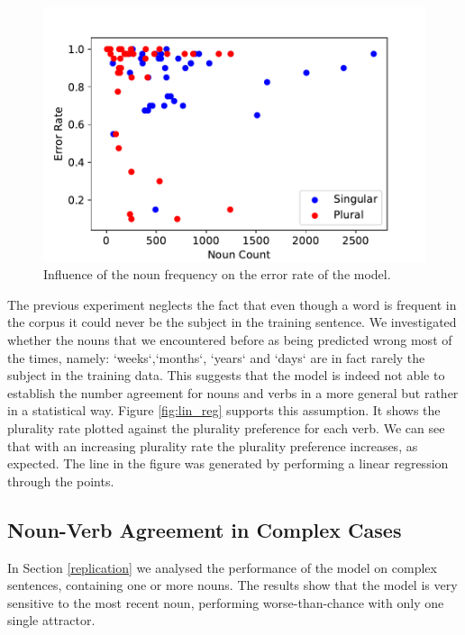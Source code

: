          \begin{figure}
          \centering
        \includegraphics[scale=0.5]{noun_freq_error_rate.pdf}
        \caption{Influence of the noun frequency on the error rate of the model.}
        \label{fig:noun_freq_error}
    \end{figure}
    
    
The previous experiment neglects the fact that even though a word is frequent in the corpus it could never be the subject in the training sentence. We investigated whether the nouns that we encountered before as being predicted wrong most of the times, namely: `weeks`,`months`, `years` and `days` are in fact rarely the subject in the training data. This suggests that the model is indeed not able to establish the number agreement for nouns and verbs in a more general but rather in a statistical way. Figure \ref{fig:lin_reg} supports this assumption. It shows the plurality rate plotted against the plurality preference for each verb. We can see that with an increasing plurality rate the plurality preference increases, as expected. The line in the figure was generated by performing a linear regression through the points. 



\subsection{Noun-Verb Agreement in Complex Cases}

In Section \ref{replication} we analysed the performance of the model
on complex sentences, containing one or more 
nouns.
The results show that the model is very
sensitive to the most recent noun,
performing worse-than-chance with only one single attractor.

